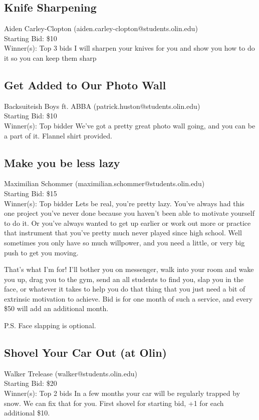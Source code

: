\documentclass[11pt]{article}
\begin{document}
\subsection{Knife Sharpening}
Aiden Carley-Clopton (aiden.carley-clopton@students.olin.edu) \\
Starting Bid: \$10 \\
Winner(s): 
Top 3 bids\newline
I will sharpen your knives for you and show you how to do it so you can keep them sharp
\subsection{Get Added to Our Photo Wall}
Backsuiteish Boys ft. ABBA (patrick.huston@students.olin.edu) \\
Starting Bid: \$10 \\
Winner(s): 
Top bidder\newline
We've got a pretty great photo wall going, and you can be a part of it. Flannel shirt provided.
\subsection{Make you be less lazy}
Maximilian Schommer (maximilian.schommer@students.olin.edu) \\
Starting Bid: \$15 \\
Winner(s): 
Top bidder\newline
Lets be real, you're pretty lazy. You've always had this one project you've never done because you haven't been able to motivate yourself to do it. Or you've always wanted to get up earlier or work out more or practice that instrument that you've pretty much never played since high school. Well sometimes you only have so much willpower, and you need a little, or very big push to get you moving. 

That's what I'm for! I'll bother you on messenger, walk into your room and wake you up, drag you to the gym, send an all students to find you, slap you in the face, or whatever it takes to help you do that thing that you just need a bit of extrinsic motivation to achieve. Bid is for one month of such a service, and every \$50 will add an additional month.

P.S. Face slapping is optional.
\subsection{Shovel Your Car Out (at Olin)}
Walker Trelease (walker@students.olin.edu) \\
Starting Bid: \$20 \\
Winner(s): 
Top 2 bids\newline
In a few months your car will be regularly trapped by snow. We can fix that for you. First shovel for starting bid, +1 for each additional \$10.
\end{document}
